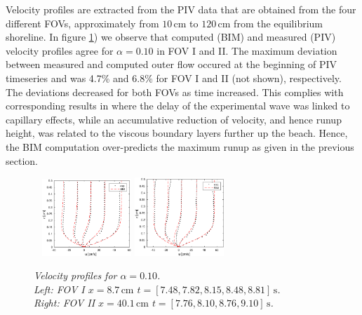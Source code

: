 \documentclass[review, authoryear]{elsarticle}
\newcommand{\s}{\,\mbox{s}}
\newcommand{\cm}{\,\mbox{cm}}
\begin{document}
Velocity profiles are extracted from the PIV data that are obtained from the four different FOVs, 
approximately from $10\cm$ to $120\cm$ from the equilibrium shoreline. 
In figure \ref{fig:BIM3_tim}) we observe that computed (BIM) and measured (PIV) velocity profiles agree for $\alpha=0.10$ in FOV I and II.  The maximum deviation between measured and computed outer flow occured at the beginning of PIV timeseries and was 4.7\% and 6.8\% for FOV I and II (not shown), respectively. The deviations decreased for both FOVs as time increased.  This complies with corresponding results in \cite{pedersen2013runup} where the
delay of the experimental wave was linked to capillary effects, while
an accumulative reduction of velocity, and hence runup height, was
related to the viscous boundary layers further up the beach.  Hence, the BIM 
computation over-predicts the maximum runup as given in the previous section.

\begin{figure}
        \centering
        ~ %
                \includegraphics[width=0.3\textwidth]{./Figures/BIM/case10_BIM_PIV_FOV3.eps}
                \includegraphics[width=0.3\textwidth]{./Figures/BIM/case10_BIM_PIV_FOV4.eps}
                \caption{\textit{ Velocity profiles for $\alpha=0.10$.\\ Left: FOV I $x=8.7\cm$ $t=[7.48, 7.82, 8.15, 8.48, 8.81]\s$.\\
                 \quad Right: FOV II $x=40.1\cm$ $t=[7.76, 8.10, 8.76, 9.10]\s$.}}
              \label{fig:BIM3_tim}
      \end{figure}
      
\end{document}
